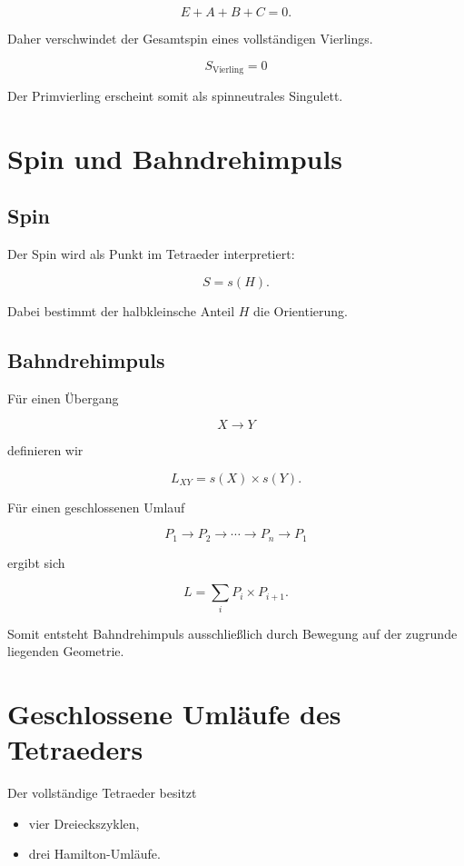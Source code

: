 \documentclass[11pt,a4paper]{article}
\begin{document}
	\[
	E+A+B+C=0.
	\]
	
	Daher verschwindet der Gesamtspin eines vollständigen Vierlings.
	
	\[
	\boxed{
		S_{\text{Vierling}}=0
	}
	\]
	
	Der Primvierling erscheint somit als spinneutrales Singulett.
	
	\section{Spin und Bahndrehimpuls}
	
	\subsection{Spin}
	
	Der Spin wird als Punkt im Tetraeder interpretiert:
	
	\[
	S=s(H).
	\]
	
	Dabei bestimmt der halbkleinsche Anteil $H$
	die Orientierung.
	
	\subsection{Bahndrehimpuls}
	
	Für einen Übergang
	
	\[
	X\rightarrow Y
	\]
	
	definieren wir
	
	\[
	L_{XY}
	=
	s(X)\times s(Y).
	\]
	
	Für einen geschlossenen Umlauf
	
	\[
	P_1\rightarrow P_2\rightarrow \cdots
	\rightarrow P_n\rightarrow P_1
	\]
	
	ergibt sich
	
	\[
	L=
	\sum_i P_i\times P_{i+1}.
	\]
	
	Somit entsteht Bahndrehimpuls ausschließlich durch Bewegung
	auf der zugrunde liegenden Geometrie.
	
	\section{Geschlossene Umläufe des Tetraeders}
	
	Der vollständige Tetraeder besitzt
	
	\begin{itemize}
		\item vier Dreieckszyklen,
		\item drei Hamilton-Umläufe.
	\end{itemize}
	
\end{document}
